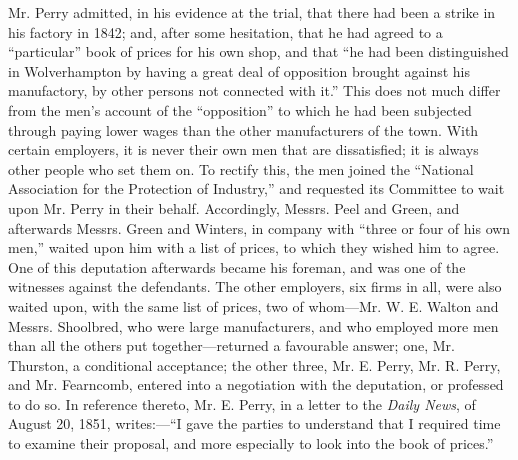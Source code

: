 Mr. Perry admitted, in his evidence at the trial, that there had been a
strike in his factory in 1842; and, after some hesitation, that he had
agreed to a ``particular'' book of prices for his own shop, and that
``he had been distinguished in Wolverhampton by having a great deal of
opposition brought against his manufactory, by other persons not
connected with it.'' This does not much differ from the men's account of
the ``opposition'' to which he had been subjected through paying lower
wages than the other manufacturers of the town. With certain employers,
it is never their own men that are dissatisfied; it is always other
people who set them on. To rectify this, the men joined the ``National
Association for the Protection of Industry,'' and requested its
Committee to wait upon Mr. Perry in their behalf. Accordingly, Messrs.
Peel and Green, and afterwards Messrs. Green and Winters, in company
with ``three or four of his own men,'' waited upon him with a list of
prices, to which they wished him to agree. One of this deputation
afterwards became his foreman, and was one of the witnesses against the
defendants. The other employers, six firms in all, were also waited
upon, with the same list of prices, two of whom---Mr. W. E. Walton and
Messrs. Shoolbred, who were large manufacturers, and who employed more
men than all the others put together---returned a favourable answer;
one, Mr. Thurston, a conditional acceptance; the other three, Mr. E.
Perry, Mr. R. Perry, and Mr. Fearncomb, entered into a negotiation with
the deputation, or professed to do so. In reference thereto, Mr. E.
Perry, in a letter to the \textit{Daily News}, of August 20, 1851,
writes:---``I gave the parties to understand that I required time to
examine their proposal, and more especially to look into the book of
prices.''